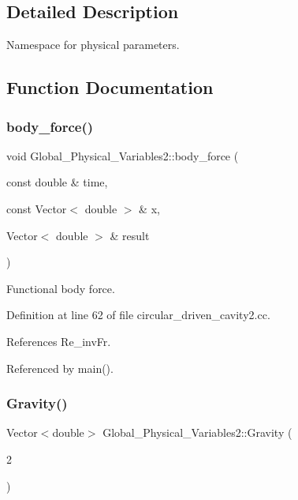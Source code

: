 \subsection{Detailed Description}
Namespace for physical parameters. 

\subsection{Function Documentation}
\mbox{\label{namespaceGlobal__Physical__Variables2_a81f723c56b35c14482cc516f0bfce3cd}} 
\subsubsection{\texorpdfstring{body\+\_\+force()}{body\_force()}}
{\footnotesize\ttfamily void Global\+\_\+\+Physical\+\_\+\+Variables2\+::body\+\_\+force (\begin{DoxyParamCaption}\item[{const double \&}]{time,  }\item[{const Vector$<$ double $>$ \&}]{x,  }\item[{Vector$<$ double $>$ \&}]{result }\end{DoxyParamCaption})}



Functional body force. 



Definition at line 62 of file circular\+\_\+driven\+\_\+cavity2.\+cc.



References Re\+\_\+inv\+Fr.



Referenced by main().

\mbox{\label{namespaceGlobal__Physical__Variables2_a302cf0e32c91f4d73a96cca3db4525bb}} 
\subsubsection{\texorpdfstring{Gravity()}{Gravity()}}
{\footnotesize\ttfamily Vector$<$double$>$ Global\+\_\+\+Physical\+\_\+\+Variables2\+::\+Gravity (\begin{DoxyParamCaption}\item[{2}]{ }\end{DoxyParamCaption})}



